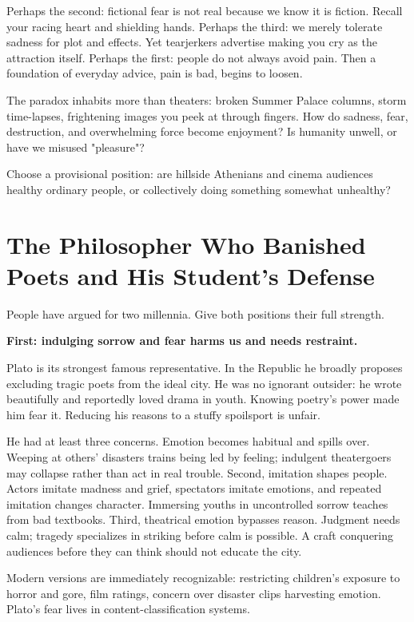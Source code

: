 Perhaps the second: fictional fear is not real because we know it is fiction. Recall your racing heart and shielding hands. Perhaps the third: we merely tolerate sadness for plot and effects. Yet tearjerkers advertise making you cry as the attraction itself. Perhaps the first: people do not always avoid pain. Then a foundation of everyday advice, pain is bad, begins to loosen.

The paradox inhabits more than theaters: broken Summer Palace columns, storm time-lapses, frightening images you peek at through fingers. How do sadness, fear, destruction, and overwhelming force become enjoyment? Is humanity unwell, or have we misused "pleasure"?

Choose a provisional position: are hillside Athenians and cinema audiences healthy ordinary people, or collectively doing something somewhat unhealthy?

\section[Plato's Ban and His Student's Defense]{The Philosopher Who Banished Poets and His Student's Defense}
People have argued for two millennia. Give both positions their full strength.

\textbf{First: indulging sorrow and fear harms us and needs restraint.}

Plato is its strongest famous representative. In the Republic he broadly proposes excluding tragic poets from the ideal city. He was no ignorant outsider: he wrote beautifully and reportedly loved drama in youth. Knowing poetry's power made him fear it. Reducing his reasons to a stuffy spoilsport is unfair.

He had at least three concerns. Emotion becomes habitual and spills over. Weeping at others' disasters trains being led by feeling; indulgent theatergoers may collapse rather than act in real trouble. Second, imitation shapes people. Actors imitate madness and grief, spectators imitate emotions, and repeated imitation changes character. Immersing youths in uncontrolled sorrow teaches from bad textbooks. Third, theatrical emotion bypasses reason. Judgment needs calm; tragedy specializes in striking before calm is possible. A craft conquering audiences before they can think should not educate the city.

Modern versions are immediately recognizable: restricting children's exposure to horror and gore, film ratings, concern over disaster clips harvesting emotion. Plato's fear lives in content-classification systems.

